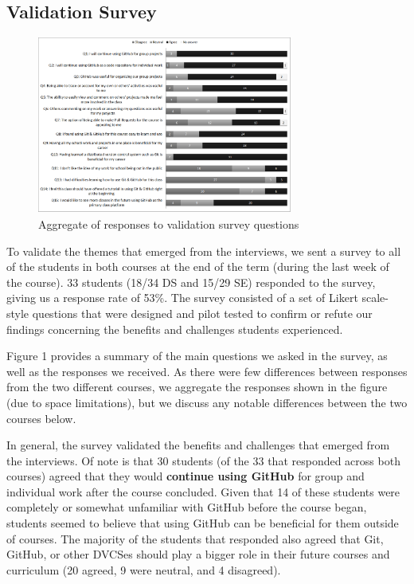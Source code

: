 
\subsection{Validation Survey}
\begin{figure}[t]
\centering
\includegraphics[width=0.75\textwidth]{surveychart}
\vspace{-4pt}
\caption{Aggregate of responses to validation survey questions}
\vspace{-12pt}
\end{figure}

To validate the themes that emerged from the interviews, we sent a survey to all of the students in both courses at the end of the term (during the last week of the course). 33 students (18/34 DS and 15/29 SE) responded to the survey, giving us a response rate of 53\%.  The survey consisted of a set of Likert scale-style questions that were designed and pilot tested to confirm or refute our findings concerning the benefits and challenges students experienced.

Figure 1 provides a summary of the main questions we asked in the survey, as well as the responses we received.
As there were few differences between responses from the two different courses, we aggregate the responses shown in the figure (due to space limitations), but we discuss any notable differences between the two courses below.

In general, the survey validated the benefits and challenges that emerged from the interviews.
Of note is that 30 students (of the 33 that responded across both courses) agreed that they would \textbf{continue using GitHub} for group and individual work after the course concluded. Given that 14 of these students were completely or somewhat unfamiliar with GitHub before the course began, students seemed to believe that using GitHub can be beneficial for them outside of courses.
The majority of the students that responded also agreed that Git, GitHub, or other DVCSes should play a bigger role in their future courses and curriculum (20 agreed, 9 were neutral, and 4 disagreed).

